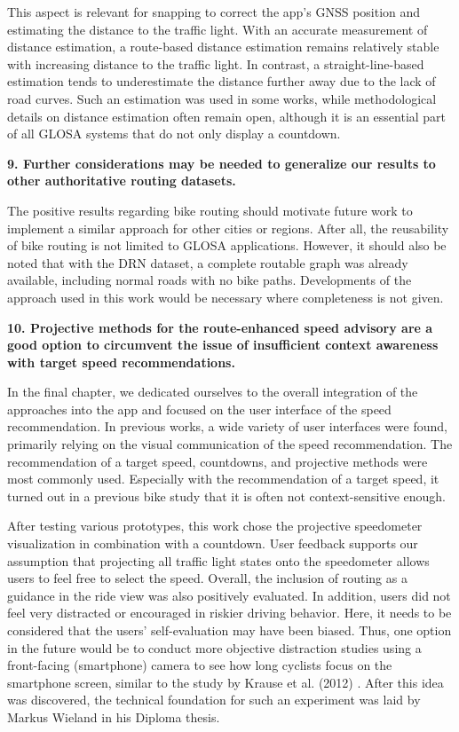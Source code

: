 This aspect is relevant for snapping to correct the app's GNSS position and estimating the distance to the traffic light. With an accurate measurement of distance estimation, a route-based distance estimation remains relatively stable with increasing distance to the traffic light. In contrast, a straight-line-based estimation tends to underestimate the distance further away due to the lack of road curves. Such an estimation was used in some works, while methodological details on distance estimation often remain open, although it is an essential part of all GLOSA systems that do not only display a countdown.

\textbf{\color{cidarkblue}9. Further considerations may be needed to generalize our results to other authoritative routing datasets.} 

The positive results regarding bike routing should motivate future work to implement a similar approach for other cities or regions. After all, the reusability of bike routing is not limited to GLOSA applications. However, it should also be noted that with the DRN dataset, a complete routable graph was already available, including normal roads with no bike paths. Developments of the approach used in this work would be necessary where completeness is not given.

\textbf{\color{cidarkblue}10. Projective methods for the route-enhanced speed advisory are a good option to circumvent the issue of insufficient context awareness with target speed recommendations.} 

In the final chapter, we dedicated ourselves to the overall integration of the approaches into the app and focused on the user interface of the speed recommendation. In previous works, a wide variety of user interfaces were found, primarily relying on the visual communication of the speed recommendation. The recommendation of a target speed, countdowns, and projective methods were most commonly used. Especially with the recommendation of a target speed, it turned out in a previous bike study that it is often not context-sensitive enough. 

After testing various prototypes, this work chose the projective speedometer visualization in combination with a countdown. User feedback supports our assumption that projecting all traffic light states onto the speedometer allows users to feel free to select the speed. Overall, the inclusion of routing as a guidance in the ride view was also positively evaluated. In addition, users did not feel very distracted or encouraged in riskier driving behavior. Here, it needs to be considered that the users' self-evaluation may have been biased. Thus, one option in the future would be to conduct more objective distraction studies using a front-facing (smartphone) camera to see how long cyclists focus on the smartphone screen, similar to the study by Krause et al. (2012) \cite{krause_traffic_2012}. After this idea was discovered, the technical foundation for such an experiment was laid by Markus Wieland \cite{wieland_2023} in his Diploma thesis.

